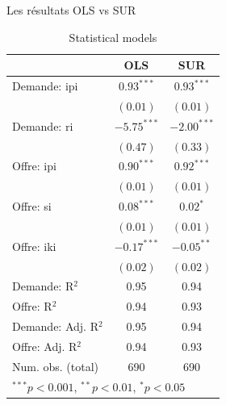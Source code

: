 \documentclass[11pt,ignorenonframetext,]{beamer}
\begin{document}
\begin{frame}{Les résultats OLS vs SUR}
\protect\hypertarget{les-resultats-ols-vs-sur}{}

\tiny

\begin{table}
\begin{center}
\begin{tabular}{l c c }
\hline
 & OLS & SUR \\
\hline
Demande: ipi        & $0.93^{***}$  & $0.93^{***}$  \\
                    & $(0.01)$      & $(0.01)$      \\
Demande: ri         & $-5.75^{***}$ & $-2.00^{***}$ \\
                    & $(0.47)$      & $(0.33)$      \\
Offre: ipi          & $0.90^{***}$  & $0.92^{***}$  \\
                    & $(0.01)$      & $(0.01)$      \\
Offre: si           & $0.08^{***}$  & $0.02^{*}$    \\
                    & $(0.01)$      & $(0.01)$      \\
Offre: iki          & $-0.17^{***}$ & $-0.05^{**}$  \\
                    & $(0.02)$      & $(0.02)$      \\
\hline
Demande: R$^2$      & 0.95          & 0.94          \\
Offre: R$^2$        & 0.94          & 0.93          \\
Demande: Adj. R$^2$ & 0.95          & 0.94          \\
Offre: Adj. R$^2$   & 0.94          & 0.93          \\
Num. obs. (total)   & 690           & 690           \\
\hline
\multicolumn{3}{l}{\scriptsize{$^{***}p<0.001$, $^{**}p<0.01$, $^*p<0.05$}}
\end{tabular}
\caption{Statistical models}
\label{table:coefficients}
\end{center}
\end{table}
\tiny

\end{frame}
\end{document}
